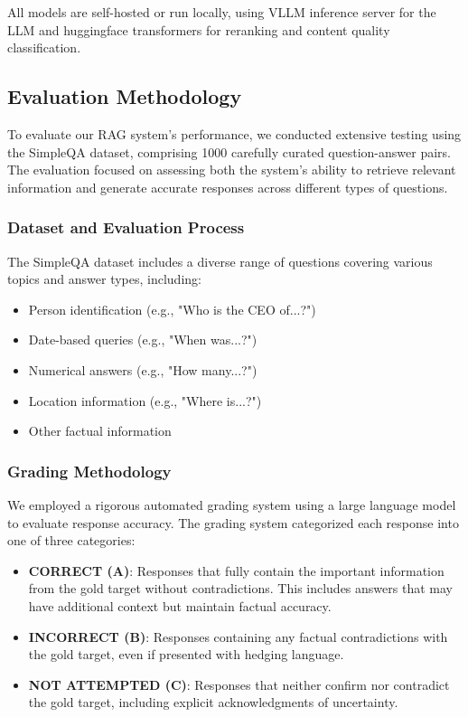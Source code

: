 \documentclass[fleqn,moreauthors,10pt]{ds_report}
\begin{document}
All models are self-hosted or run locally, using VLLM inference server for the LLM and huggingface transformers for reranking and content quality classification.

\subsection*{Evaluation Methodology}
To evaluate our RAG system's performance, we conducted extensive testing using the SimpleQA dataset, comprising 1000 carefully curated question-answer pairs. The evaluation focused on assessing both the system's ability to retrieve relevant information and generate accurate responses across different types of questions.

\subsubsection*{Dataset and Evaluation Process}
The SimpleQA dataset includes a diverse range of questions covering various topics and answer types, including:
\begin{itemize}[noitemsep]
    \item Person identification (e.g., "Who is the CEO of...?")
    \item Date-based queries (e.g., "When was...?")
    \item Numerical answers (e.g., "How many...?")
    \item Location information (e.g., "Where is...?")
    \item Other factual information
\end{itemize}

\subsubsection*{Grading Methodology}
We employed a rigorous automated grading system using a large language model to evaluate response accuracy. The grading system categorized each response into one of three categories:

\begin{itemize}[noitemsep]
    \item \textbf{CORRECT (A)}: Responses that fully contain the important information from the gold target without contradictions. This includes answers that may have additional context but maintain factual accuracy.
    \item \textbf{INCORRECT (B)}: Responses containing any factual contradictions with the gold target, even if presented with hedging language.
    \item \textbf{NOT ATTEMPTED (C)}: Responses that neither confirm nor contradict the gold target, including explicit acknowledgments of uncertainty.
\end{itemize}
\end{document}
